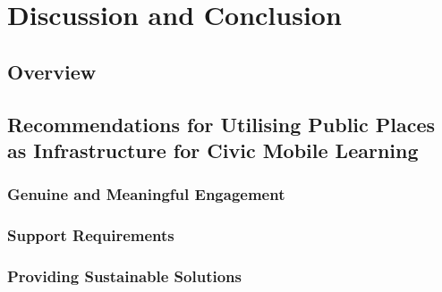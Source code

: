 \chapter{Discussion and Conclusion}

\section{Overview}

\section{Recommendations for Utilising Public Places as Infrastructure for Civic Mobile Learning}

\subsection{Genuine and Meaningful Engagement}
\subsection{Support Requirements}
\subsection{Providing Sustainable Solutions}